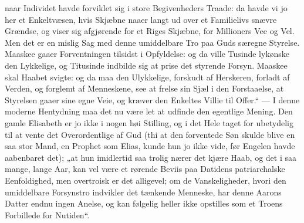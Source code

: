 \documentclass[12pt,a4paper]{book}
\begin{document}
naar Individet havde forviklet sig i store Begivenheders Traade: da
havde vi jo her et Enkeltvæsen, hvis Skjæbne naaer langt ud over et
Familielivs snævre Grændse, og viser sig afgjørende for et Riges
Skjæbne, for Millioners Vee og Vel. Men det er en mislig Sag med denne
umiddelbare Tro paa Guds særegne Styrelse. Maaskee gaaer Forventningen
tilsidst i Opfyldelse: og da ville Tusinde lykønske den Lykkelige, og
Titusinde indbilde sig at prise det styrende
Forsyn. Maaskee skal Haabet svigte: og da maa den Ulykkelige, forskudt
af Herskeren, forladt af Verden, og forglemt af Menneskene, see at
frelse sin Sjæl i den Forstaaelse, at Styrelsen gaaer sine egne Veie,
og kræver den Enkeltes Villie til Offer.“ --- I denne moderne
Hentydning maa det nu være let at udfinde den egentlige Mening. Den
gamle Elisabeth er jo ikke i nogen høi Stilling, og i det Hele taget
for ubetydelig til at vente det Overordentlige af Gud (thi at den
forventede Søn skulde blive en saa stor Mand, en Prophet som Elias,
kunde hun jo ikke vide, før Engelen havde aabenbaret det); „at hun
imidlertid saa trolig nærer det kjære Haab, og det i saa mange, lange
Aar, kan vel være et rørende Beviis paa Datidens patriarchalske
Eenfoldighed, men overtroisk er det alligevel; om de Vanskeligheder,
hvori den umiddelbare Forsynstro indvikler det tænkende Menneske, har
denne Aarons Datter endnu ingen Anelse, og kan følgelig heller ikke
opstilles som et Troens Forbillede for Nutiden“.
\end{document}
